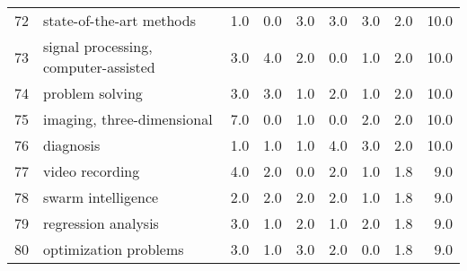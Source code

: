 \begin{tabular}{llrrrrrrr}
72 &                 state-of-the-art methods &   1.0 &   0.0 &   3.0 &   3.0 &   3.0 &   2.0 &   10.0 \\
73 &     signal processing, computer-assisted &   3.0 &   4.0 &   2.0 &   0.0 &   1.0 &   2.0 &   10.0 \\
74 &                          problem solving &   3.0 &   3.0 &   1.0 &   2.0 &   1.0 &   2.0 &   10.0 \\
75 &               imaging, three-dimensional &   7.0 &   0.0 &   1.0 &   0.0 &   2.0 &   2.0 &   10.0 \\
76 &                                diagnosis &   1.0 &   1.0 &   1.0 &   4.0 &   3.0 &   2.0 &   10.0 \\
77 &                          video recording &   4.0 &   2.0 &   0.0 &   2.0 &   1.0 &   1.8 &    9.0 \\
78 &                       swarm intelligence &   2.0 &   2.0 &   2.0 &   2.0 &   1.0 &   1.8 &    9.0 \\
79 &                      regression analysis &   3.0 &   1.0 &   2.0 &   1.0 &   2.0 &   1.8 &    9.0 \\
80 &                    optimization problems &   3.0 &   1.0 &   3.0 &   2.0 &   0.0 &   1.8 &    9.0 \\
\bottomrule
\end{tabular}
